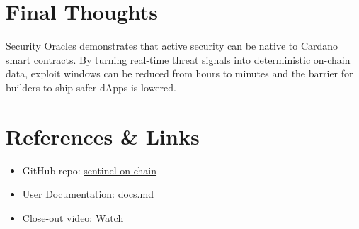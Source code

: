 \documentclass[11pt,a4paper]{article}
\begin{document}
\section*{Final Thoughts}
Security Oracles demonstrates that active security can be native to Cardano smart contracts. By turning real-time threat signals into deterministic on-chain data, exploit windows can be reduced from hours to minutes and the barrier for builders to ship safer dApps is lowered.

\section*{References \& Links}
\begin{itemize}
  \item GitHub repo: \href{https://github.com/projet-sentinel/sentinel-on-chain}{sentinel-on-chain}
  \item User Documentation: \href{https://github.com/gammer13/pcf11-security-oracles/blob/main/docs.md}{docs.md}
  \item Close-out video: \href{https://www.canva.com/design/DAGyXEU3Kv0/Y23RJxfzns6pkRaEf0SNPQ/watch}{Watch}
\end{itemize}
\end{document}
